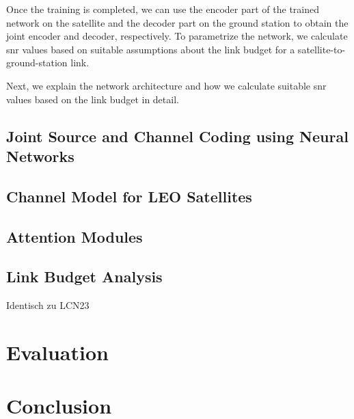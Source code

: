 \documentclass[conference]{IEEEtran}
\begin{document}

Once the training is completed, we can use the encoder part of the trained network on the satellite and the decoder part on the ground station to obtain the joint encoder and decoder, respectively.
To parametrize the network, we calculate \ac{snr} values based on suitable assumptions about the link budget for a satellite-to-ground-station link.

Next, we explain the network architecture and how we calculate suitable \ac{snr} values based on the link budget in detail.


\subsection{Joint Source and Channel Coding using Neural Networks}

\subsection{Channel Model for LEO Satellites}

\subsection{Attention Modules}

\subsection{Link Budget Analysis}
Identisch zu LCN23

\section{Evaluation}
\label{sec:evaluation}

\section{Conclusion}
\label{sec:conclusion}



\end{document}
